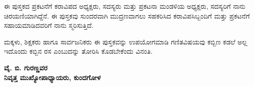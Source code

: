 \medskip
\noindent
ಈ ಪುಸ್ತಕದ ಪ್ರಕಟನೆಗೆ ಕರಾವಿಪದ ಅಧ್ಯಕ್ಷರು, ಸದಸ್ಯರು ಮತ್ತು ಪ್ರಕಟನಾ ಮಂಡಳಿಯ ಅಧ್ಯಕ್ಷರು, ಸದಸ್ಯರಿಗೆ ನಾನು ಚಿರಯಣಿಯಾಗಿದ್ದೆನೆ. ಈ ಪುಸ್ತಕವು ಸುಂದರವಾಗಿ ಮುದ್ರಣವಾಗಲು ಸಹಕರಿಸಿದ ಕರಾವಿಪಸಿಬ್ಬಂದಿಗೆ ಮತ್ತು ಪ್ರಕಟನೆಗೆ ಸಹಾಯಮಾಡಿದವರಿಗೆ ನಾನು ಸ್ಮರಿಸುತ್ತಿದೆ. 

\noindent
ಮಕ್ಕಳು, ಶಿಕ್ಷಕರು ಹಾಗೂ ಸಾರ್ವಜನಿಕರು ಈ ಪುಸ್ತಕವನ್ನು ಉಪಯೋಗಮಾಡಿ ಗಣಿತ\break ವಿಷಯವು ಕಬ್ಬಿಣ ಕಡಲೆ ಅಲ್ಲ ಇದೊಂದು ಕಬ್ಬಿನ ರಸ ಎಂಬುದನ್ನು ತೋರಿಸಿ ಕೊಡ\break ಬೇಕೆಂದು ವಿನಂತಿ. 

\begin{flushright}
{\bf ವೈ. ಬಿ. ಗುರಣ್ಣವರ}\\
{\bf ನಿವೃತ್ತ ಮುಖ್ಯೋಪಾಧ್ಯಾಯರು,  ಕುಂದಗೋಳ}\\
\end{flushright}


